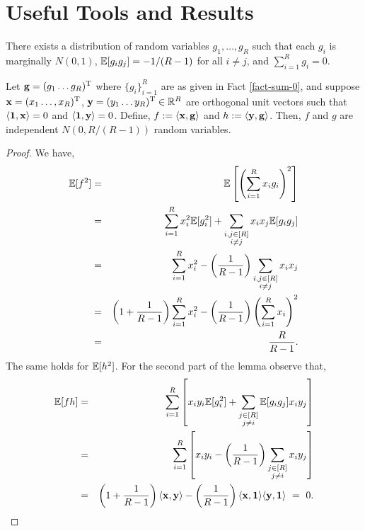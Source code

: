 \section{Useful Tools and Results}\label{sec-useful-appendix}
\begin{fact}\label{fact-sum-0}
There exists a distribution of random variables $g_1, \dots, g_R$ such
that each $g_i$ is marginally $N(0,1)$, $\mathbb{E}[g_ig_j] = -1/(R-1)$ for
all $i\neq j$, and $\sum_{i=1}^R g_i = 0$.
\end{fact}
\begin{lemma}\label{lem-ortho-transform}
Let ${\bf g} = (g_1 \dots g_R)^{\tn{T}}$ where $\{g_i\}_{i=1}^R$ are 
as given in Fact \ref{fact-sum-0}, and suppose
${\bf x} = (x_1 \dots, x_R)^{\tn{T}}$, ${\bf y} = (y_1 \dots
y_R)^{\tn{T}} \in \R^R$ are orthogonal unit vectors such that
$\langle \mathbf{1}, {\bf x}\rangle = 0$ and  $\langle \mathbf{1}, {\bf
y}\rangle = 0$. Define, $f := \langle {\bf x}, {\bf g}\rangle$ and $h
:= \langle {\bf y}, {\bf g}\rangle$.  Then, $f$ and $g$ are 
independent $N(0, R/(R-1))$ random variables.
\end{lemma}
\begin{proof}
We have,
\begin{eqnarray}
\displaystyle \mathbb{E}[f^2] & = &
\mathbb{E}\left[\left(\sum_{i=1}^Rx_ig_i\right)^2\right] \nonumber \\
& = & \sum_{i=1}^Rx_i^2\mathbb{E}[g_i^2] + \sum_{\substack{i,j\in [R]\\ i\neq
j}}x_ix_j \mathbb{E}[g_ig_j] \nonumber \\
& = & \sum_{i=1}^Rx_i^2 - \left(\frac{1}{R-1}\right)
\sum_{\substack{i,j\in [R]\\ i\neq j}}x_ix_j \nonumber \\ 
& = & \left(1 + \frac{1}{R-1}\right)\sum_{i=1}^Rx_i^2 -
\left(\frac{1}{R-1}\right)\left(\sum_{i=1}^Rx_i\right)^2 \nonumber \\
& = & \frac{R}{R-1}.
\end{eqnarray}
The same holds for $\mathbb{E}[h^2]$. For the second part of the lemma
observe that,
\begin{eqnarray}
\E[fh] & = & \sum_{i=1}^R\left[x_iy_i\E[g_i^2] + \sum_{\substack{j\in [R] \\ j\neq
i}}\E[g_ig_j]x_iy_j \right] \nonumber \\
& = & \sum_{i=1}^R\left[ x_iy_i - \left(\frac{1}{R-1}\right)\sum_{\substack{j\in [R] \\ j\neq
i}}x_iy_j\right] \nonumber \\
& = & \left(1 + \frac{1}{R-1}\right)\langle {\bf x}, {\bf y}\rangle -
\left(\frac{1}{R-1}\right)\langle {\bf x}, {\bf 1}\rangle\langle {\bf
y}, {\bf 1}\rangle \ = \ 0. 
\end{eqnarray} 
\end{proof}

